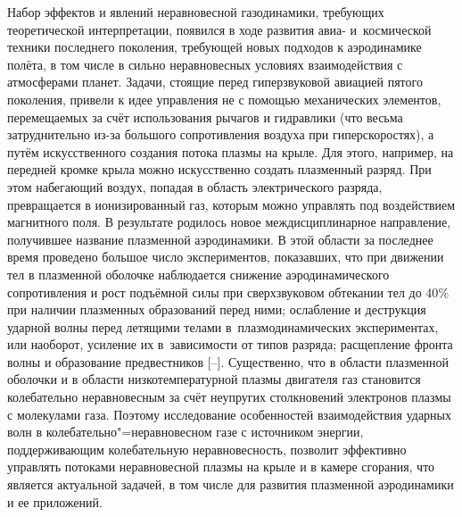 
\date{26/VII/2012} %




\maketitle

\small

Набор эффектов и явлений неравновесной газодинамики, требующих теоретической интерпретации, появился в ходе развития авиа- и~космической техники последнего поколения, требующей новых подходов
к аэродинамике полёта, в том числе в сильно неравновесных
условиях взаимодействия с атмосферами планет. Задачи, стоящие
перед гиперзвуковой авиацией пятого поколения, привели к идее
управления не с помощью механических элементов, перемещаемых за счёт использования
рычагов и гидравлики (что весьма затруднительно из-за большого
сопротивления воздуха при гиперскоростях), а путём
искусственного создания потока плазмы на крыле. Для этого,
например, на передней кромке крыла можно искусственно создать
плазменный разряд. При этом набегающий воздух, попадая в область
электрического разряда, превращается в ионизированный газ, которым
можно управлять под воздействием магнитного поля. В результате
родилось новое междисциплинарное направление, получившее название
плазменной аэродинамики. В этой области за последнее время
проведено большое число экспериментов, показавших, что при движении
тел в плазменной оболочке наблюдается снижение аэродинамического
сопротивления и рост подъёмной силы при сверхзвуковом обтекании
тел до 40$\%$ при наличии плазменных образований перед ними;
ослабление и деструкция ударной волны перед летящими телами в~плазмодинамических экспериментах, или наоборот, усиление их в~зависимости от типов разряда; расщепление фронта волны и
образование предвестников [--]. Существенно, что в области
плазменной оболочки и в области низкотемпературной плазмы
двигателя газ становится колебательно неравновесным за счёт
неупругих столкновений электронов плазмы с молекулами газа.
Поэтому исследование особенностей взаимодействия ударных волн в
колебательно"=неравновесном газе с источником энергии,
поддерживающим колебательную неравновесность, позволит эффективно
управлять потоками неравновесной плазмы на крыле и в камере
сгорания, что является актуальной задачей, в том числе для
развития плазменной аэродинамики и ее приложений.

